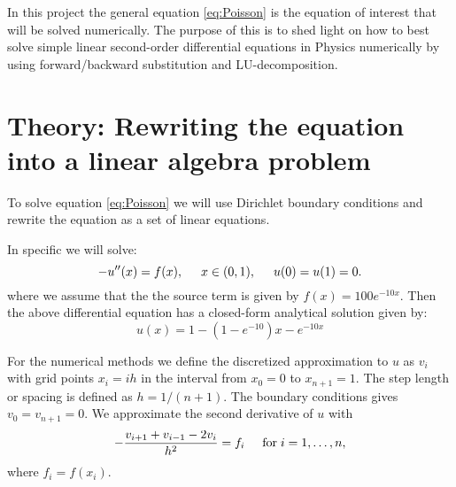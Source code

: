 \documentclass[11pt,a4wide]{article}
\begin{document}
In this project the general equation \ref{eq:Poisson} is the equation of interest that will be solved numerically. The purpose of this is to shed light on how to best solve simple linear second-order differential equations in Physics numerically by using forward/backward substitution and LU-decomposition. 

\section{Theory: Rewriting the equation into a linear algebra problem}
To solve equation \ref{eq:Poisson} we will use Dirichlet boundary conditions and rewrite the equation as a set of linear equations.

In specific we will solve:
\[
-u''(x) = f(x), \hspace{0.5cm} x\in(0,1), \hspace{0.5cm} u(0) = u(1) = 0.
\]
where we assume that the the source term is given by $f(x) = 100e^{-10x}$.  Then the above differential equation
has a closed-form analytical solution given by:
\begin{equation}
u(x) = 1-(1-e^{-10})x-e^{-10x}
\label{eq:analytical_sol}
\end{equation}

For the numerical methods we define the discretized approximation  to $u$ as $v_i$  with grid points $x_i=ih$ in the interval from $x_0=0$ to $x_{n+1}=1$.
The step length or spacing is defined as $h=1/(n+1)$. The boundary conditions gives $v_0 = v_{n+1} = 0$.
We  approximate the second derivative of $u$ with 
\begin{equation}
-\frac{v_{i+1}+v_{i-1}-2v_i}{h^2} = f_i  \hspace{0.5cm} \mathrm{for} \hspace{0.1cm} i=1,\dots, n,
\label{eq:sec_der}
\end{equation}
where $f_i=f(x_i)$.
\end{document}
